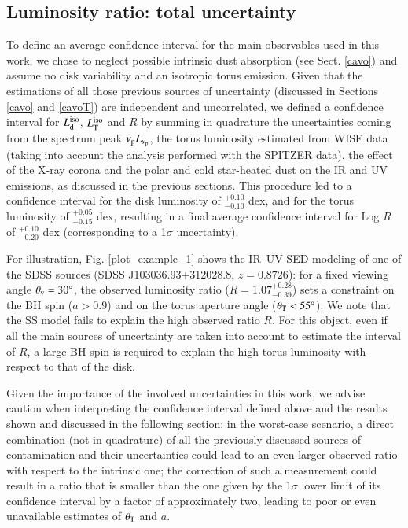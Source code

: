 \documentclass[]{aa}
\begin{document}
\subsection{Luminosity ratio: total uncertainty} \label{Runcert}

To define an average confidence interval for the main observables used in this work, we chose to neglect possible intrinsic dust absorption (see Sect. \ref{cavo}) and assume no disk variability and an isotropic torus emission. Given that the estimations of all those previous sources of uncertainty (discussed in Sections \ref{cavo} and \ref{cavoT}) are independent and uncorrelated, we defined a confidence interval for $L^{\rm iso}_{\rm d}$, $L^{\rm iso}_{\rm T}$ and $R$ by summing in quadrature the uncertainties coming from the spectrum peak $\nu_{\rm p} L_{\nu_{\rm p}}$, the torus luminosity estimated from WISE data (taking into account the analysis performed with the SPITZER data), the effect of the X-ray corona and the polar and cold star-heated dust on the IR and UV emissions, as discussed in the previous sections. This procedure led to a confidence interval for the disk luminosity of $^{+0.10}_{-0.10}$ dex, and for the torus luminosity of $^{+0.05}_{-0.15}$ dex, resulting in a final average confidence interval for Log $R$ of $^{+0.10}_{-0.20}$ dex (corresponding to a 1$\sigma$ uncertainty).

For illustration, Fig. \ref{plot_example_1} shows the IR--UV SED modeling of one of the SDSS sources (SDSS J103036.93+312028.8, $z=0.8726$): for a fixed viewing angle $\theta_{\rm v} = 30^{\circ}$, the observed luminosity ratio ($R = 1.07^{+0.28}_{-0.39}$) sets a constraint on the BH spin ($a>0.9$) and on the torus aperture angle ($\theta_{\rm T} < 55^{\circ}$). We note that the SS model fails to explain the high observed ratio $R$. For this object, even if all the main sources of uncertainty are taken into account to estimate the interval of $R$, a large BH spin is required to explain the high torus luminosity with respect to that of the disk.

Given the importance of the involved uncertainties in this work, we advise caution when interpreting the confidence interval defined above and the results shown and discussed in the following section: in the worst-case scenario, a direct combination (not in quadrature) of all the previously discussed sources of contamination and their uncertainties could lead to an even larger observed ratio with respect to the intrinsic one; the correction of such a measurement could result in a ratio that is smaller than the one given by the 1$\sigma$ lower limit of its confidence interval by a factor of approximately two, leading to poor or even unavailable estimates of $\theta_{\rm T}$ and $a$.
\end{document}
